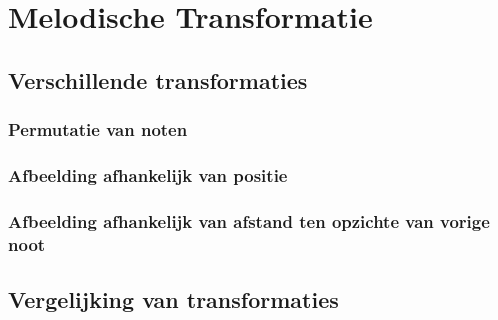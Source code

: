 \chapter{Melodische Transformatie}
\label{hoofdstuk:MT}

\section{Verschillende transformaties}

\subsection{Permutatie van noten}

\subsection{Afbeelding afhankelijk van positie}

\subsection{Afbeelding afhankelijk van afstand ten opzichte van vorige noot}
\label{MT:afstand_vorige}

\section{Vergelijking van transformaties}

